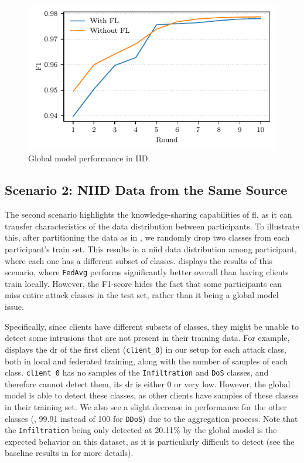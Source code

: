 \begin{figure}
    \centering
    \includegraphics{figures/iid.pdf}
    \caption{Global model performance in IID.}
    \label{fig:iid}
\end{figure}


\subsection{Scenario 2: NIID Data from the Same Source\label{sec:demo.niid}}

The second scenario highlights the knowledge-sharing capabilities of \gls{fl}, as it can transfer characteristics of the data distribution between participants.
To illustrate this, after partitioning the data as in , we randomly drop two classes from each participant's train set.
This results in a \gls{niid} data distribution among participant, where each one has a different subset of classes.
 displays the results of this scenario, where \texttt{FedAvg} performs significantly better overall than having clients train locally.
However, the F1-score hides the fact that some participants can miss entire attack classes in the test set, rather than it being a global model issue.

Specifically, since clients have different subsets of classes, they might be unable to detect some intrusions that are not present in their training data.
For example,  displays the \gls{dr} of the first client (\texttt{client\_0}) in our setup for each attack class, both in local and federated training, along with the number of samples of each class.
\texttt{client\_0} has no samples of the \texttt{Infiltration} and \texttt{DoS} classes, and therefore cannot detect them, \ie its \gls{dr} is either 0 or very low.
However, the global model is able to detect these classes, as other clients have samples of these classes in their training set.
We also see a slight decrease in performance for the other classes (\eg, 99.91 instead of 100 for \texttt{DDoS}) due to the aggregation process.
Note that the \texttt{Infiltration} being only detected at 20.11\% by the global model is the expected behavior on this dataset, as it is particularly difficult to detect (see the baseline results in  for more details).

